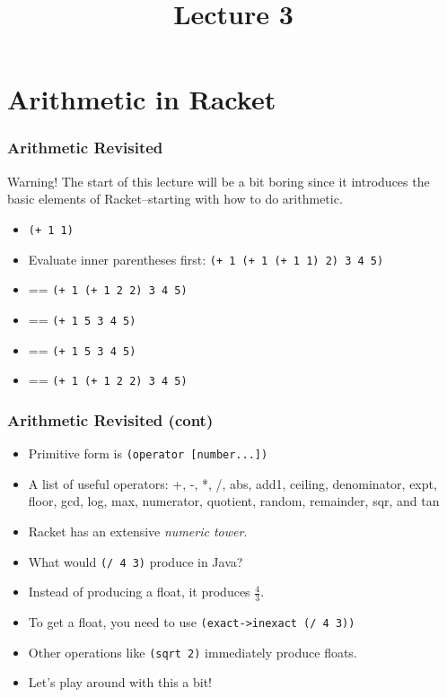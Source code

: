 \documentclass{beamer}
\title{Lecture 3}
\begin{document}
\begin{frame}
\titlepage
\end{frame}

\section{Arithmetic in Racket}
\begin{frame}
  \frametitle{Arithmetic Revisited}
  Warning! The start of this lecture will be a bit boring since it introduces
  the basic elements of Racket--starting with how to do arithmetic.
  \begin{itemize}
  \item<2-> \texttt{(+ 1 1)}
  \item<3-> Evaluate inner parentheses first: \texttt{(+ 1 (+ 1 (+ 1 1) 2) 3 4 5)}
  \item<4-> == \texttt{(+ 1 (+ 1 2 2) 3 4 5)}
  \item<5-> == \texttt{(+ 1 5 3 4 5)}
  \item<6-> == \texttt{(+ 1 5 3 4 5)}
  \item<7-> == \texttt{(+ 1 (+ 1 2 2) 3 4 5)}
  \end{itemize}
\end{frame}

\begin{frame}
  \frametitle{Arithmetic Revisited (cont)}
  \begin{itemize}
  \item<1-> Primitive form is \texttt{(operator [number...])}
  \item<2-> A list of useful operators:  +, -, *, /, abs, add1, ceiling, denominator, expt, floor, gcd, log, max, numerator, quotient, random, remainder, sqr, and tan
  \item<3-> Racket has an extensive \emph{numeric tower}.
  \item<4-> What would \texttt{(/ 4 3)} produce in Java?
  \item<5-> Instead of producing a float, it produces $\frac{4}{3}$.
  \item<6-> To get a float, you need to use \texttt{(exact->inexact (/ 4 3))}
  \item<7-> Other operations like \texttt{(sqrt 2)} immediately produce floats.
  \item<8-> Let's play around with this a bit!
  \end{itemize}
\end{frame}
\end{document}
